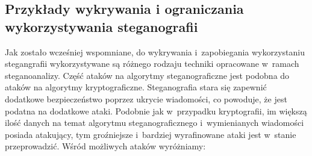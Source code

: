 \documentclass[a4paper, twoside, openright, 12pt]{report}
\begin{document}
        \subsection{Przykłady wykrywania i ograniczania  wykorzystywania steganografii}
        Jak zostało wcześniej wspomniane, do wykrywania i~zapobiegania wykorzystaniu stegangrafii
        wykorzystywane są różnego rodzaju techniki opracowane w~ramach steganoanalizy.
        Część ataków na algorytmy steganograficzne jest podobna do ataków na
        algorytmy kryptograficzne. Steganografia stara się zapewnić dodatkowe bezpieczeństwo
        poprzez ukrycie wiadomości, co powoduje, że jest podatna na dodatkowe ataki.
        Podobnie jak w~przypadku kryptografii, im większą ilość danych na temat
        algorytmu steganograficznego i~wymienianych wiadomości posiada atakujący,
        tym groźniejsze i~bardziej wyrafinowane ataki jest w~stanie przeprowadzić.
        Wśród możliwych ataków wyróżniamy\cite{DISAPPEARINGCRYPTOEMBEDDINGMETDATA}:
\end{document}
